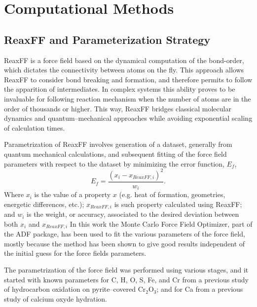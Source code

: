 \documentclass[journal=jpcafh,manuscript=article]{achemso}
\begin{document}
\section{Computational Methods}

\subsection{ReaxFF and Parameterization Strategy}
\label{sec:reaxff-strategy}

ReaxFF is a force field based on the dynamical computation of the bond-order, which dictates the connectivity between atoms on the fly.
This approach allows ReaxFF to consider bond breaking and formation, and therefore permits to follow the apparition of intermediates.
In complex systems this ability proves to be invaluable for following reaction mechanism when the number of atoms are in the order of thousands or higher.\cite{migliorati_development_2017,merinov_reaxff_2014,
raymand_reactive_2008,
shin_development_2015,
van_duin_reaxff_2008,
goddard_development_2006,
hubin_parameterization_2016,
senftle_reaxff_2016,
chenoweth_reaxff_2009,
chenoweth_reaxff_2008,
van_duin_reaxff_2008-1,
liu_reaxff-lg:_2011}
This way, ReaxFF bridges classical molecular dynamics and quantum--mechanical approaches while avoiding exponential scaling of calculation times.

Parametrization of ReaxFF involves generation of a dataset, generally from quantum mechanical calculations, and subsequent fitting of the force field parameters with respect to the dataset by minimizing the error function, $E_f$,
\begin{equation}
E_f = \frac{(x_{i} - x_{ReaxFF,i})^2}{w_i}.
\end{equation}
Where $x_{i}$ is the value of a property $x$ (e.g. heat of formation, geometries, energetic differences, etc.); $x_{ReaxFF,i}$ is such property calculated using ReaxFF; and $w_i$ is the weight, or accuracy, associated to the desired deviation between both $x_i$ and $x_{ReaxFF,i}$
In this work the Monte Carlo Force Field Optimizer,\cite{iype_parameterization_2013} part of the ADF package, has been used to fit the various parameters of the force field, mostly because the method has been shown to give good results independent of the initial guess for the force fields parameters.

The parametrization of the force field was performed using various stages, and it started with known parameters for C, H, O, S, Fe, and Cr from a previous study of hydrocarbon oxidation on pyrite--covered Cr$_2$O$_3$; \cite{shin_development_2015} and for Ca from a previous study of calcium oxyde hydration. \cite{manzano_hydration_2012}
\end{document}
